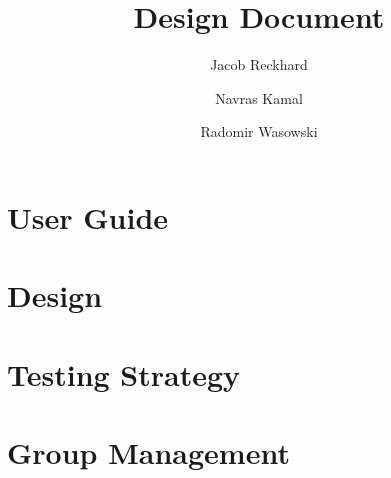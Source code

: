 \documentclass{article}
\title{Design Document}
\author{Jacob Reckhard \and Navras Kamal \and Radomir Wasowski}
\begin{document}
\maketitle

\section{User Guide}


\section{Design}


\section{Testing Strategy}


\section{Group Management}

\end{document}
